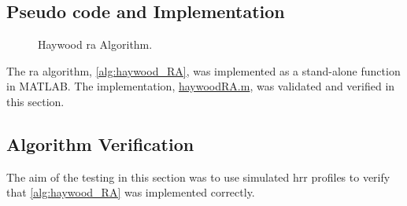 \documentclass[class=report,11pt,crop=false]{standalone}
\begin{document}
    \subsection{Pseudo code and Implementation}
    \begin{figure}[ht]
      \vspace{0.5cm}
      \centering
      \captionsetup{type=figure}
      \begin{minipage}{.7\linewidth}
        \begin{algorithm}[H]
        \caption{Haywood \gls{ra} Algorithm.\label{alg:haywood_RA}}
    
        \LinesNumbered %
        \DontPrintSemicolon
        \SetAlgoLined
    
    
        \BlankLine
        \vspace{0.5cm}
        \end{algorithm}
      \end{minipage}
    \end{figure}

    The \gls{ra} algorithm, \autoref{alg:haywood_RA}, was implemented as a stand-alone function in \textsc{MATLAB}. The implementation, \href{}{haywoodRA.m}, was validated and verified in this section.
    
    \subsection{Algorithm Verification}
    The aim of the testing in this section was to use simulated \gls{hrr} profiles to verify that \autoref{alg:haywood_RA} was implemented correctly.
\end{document}
